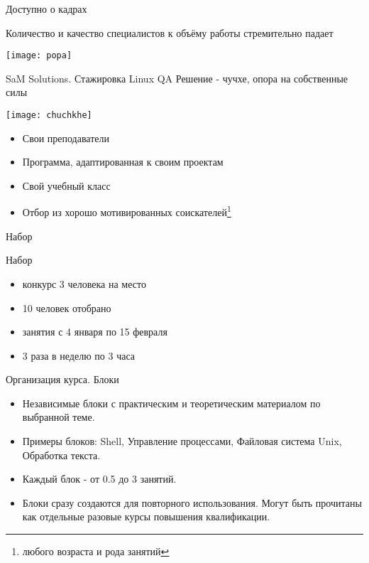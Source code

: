 \begin{frame}[fragile]{Доступно о кадрах}
 
  \begin{center}
    \Large Количество и качество \newline специалистов к объёму работы \newline стремительно падает 

    \texttt{[image: popa]}
  \end{center}

\end{frame}

\begin{frame}{SaM Solutions. Стажировка Linux QA}
  \center\alert{Решение - чучхе, опора на собственные силы}
  
  \center\texttt{[image: chuchkhe]}

  \begin{itemize}
    \item Свои преподаватели
    \item Программа, адаптированная к своим проектам
    \item Свой учебный класс
    \item Отбор из хорошо мотивированных соискателей\footnote{любого возраста и рода занятий}
  \end{itemize} 


\end{frame}

\begin{frame}{Набор}


  \alert{Набор}
  \begin{itemize}
    \item конкурс 3 человека на место
    \item 10 человек отобрано
    \item занятия с 4 января по 15 февраля
    \item 3 раза в неделю по 3 часа
  \end{itemize}

\end{frame}

\begin{frame}{Организация курса. Блоки}
  
  \begin{itemize}
    \item Независимые блоки с практическим и теоретическим материалом по выбранной теме.
    \item Примеры блоков: Shell, Управление процессами, Файловая система Unix, Обработка текста.
    \item Каждый блок - от 0.5 до 3 занятий.
    \item Блоки сразу создаются для повторного использования.  \newline
      Могут быть прочитаны как отдельные разовые курсы повышения квалификации.
  \end{itemize}

\end{frame}


